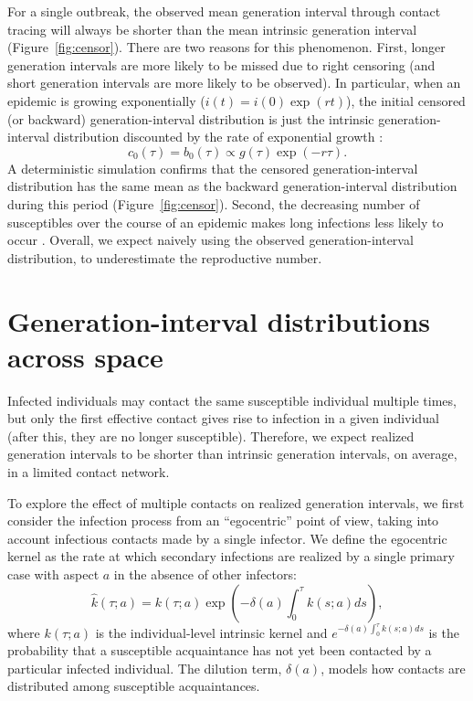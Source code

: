 \documentclass[12pt]{article}
\begin{document}
For a single outbreak, the observed mean  generation interval through contact tracing will always be shorter than the mean intrinsic generation interval (Figure~\ref{fig:censor}).
There are two reasons for this phenomenon.
First, longer generation intervals are more likely to be missed due to right censoring (and short generation intervals are more likely to be observed).
In particular, when an epidemic is growing exponentially ($i(t) = i(0) \exp(rt)$), 
the initial censored (or backward) generation-interval distribution is just the intrinsic generation-interval distribution discounted by the rate of exponential growth \citep{britton2019estimation}:
\begin{equation}
c_0(\tau) = b_0(\tau) \propto g(\tau) \exp(-r\tau).
\label{eq:exp}
\end{equation}
A deterministic simulation confirms that the censored generation-interval distribution has the same mean as the backward generation-interval distribution during this period (Figure~\ref{fig:censor}).
Second, the decreasing number of susceptibles over the course of an epidemic makes long infections less likely to occur \citep{champredon2015intrinsic}.
Overall, we expect naively using the observed generation-interval distribution, to underestimate the reproductive number.


\section{Generation-interval distributions across space}

Infected individuals may contact the same susceptible individual multiple times, but only the first effective contact gives rise to infection in a given individual (after this, they are no longer susceptible).
Therefore, we expect realized generation intervals to be shorter than intrinsic generation intervals, on average, in a limited contact network.

To explore the effect of multiple contacts on realized generation intervals, we first consider the infection process from an ``egocentric'' point of view, taking into account infectious contacts made by a single infector.
We define the egocentric kernel as the rate at which secondary infections are realized by a single primary case with aspect $a$ in the absence of other infectors:
\begin{equation}
\hat{k}(\tau; a) = k(\tau; a) \exp \left(- \delta(a) \int_0^\tau k(s; a) ds\right),
\end{equation}
where $k(\tau; a)$ is the individual-level intrinsic kernel and $e^{- \delta(a) \int_0^\tau k(s; a) ds}$ is the probability that a susceptible acquaintance has not yet been contacted by a particular infected individual.
The dilution term, $\delta(a)$, models how contacts are distributed among susceptible acquaintances.
\end{document}

